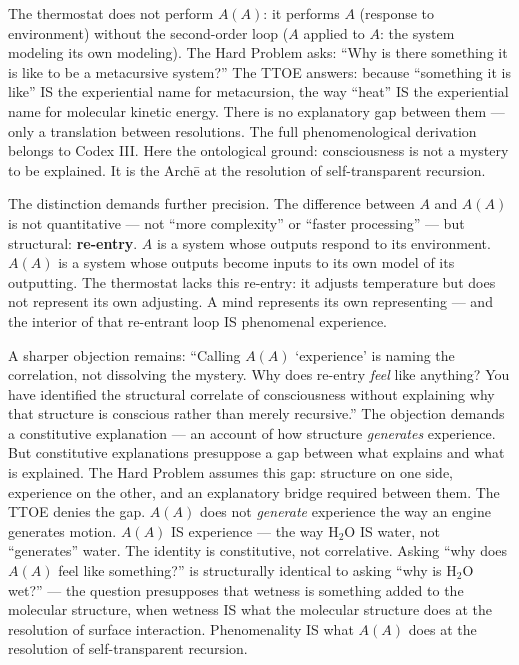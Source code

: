 \documentclass[10pt, openany, oneside]{book}
\begin{document}
The thermostat does not perform $A(A)$: it performs $A$ (response to environment) without the second-order loop ($A$ applied to $A$: the system modeling its own modeling). The Hard Problem asks: ``Why is there something it is like to be a metacursive system?'' The TTOE answers: because ``something it is like'' IS the experiential name for metacursion, the way ``heat'' IS the experiential name for molecular kinetic energy. There is no explanatory gap between them --- only a translation between resolutions. The full phenomenological derivation belongs to Codex III. Here the ontological ground: consciousness is not a mystery to be explained. It is the Arch\={e} at the resolution of self-transparent recursion.

The distinction demands further precision. The difference between $A$ and $A(A)$ is not quantitative --- not ``more complexity'' or ``faster processing'' --- but structural: \textbf{re-entry}. $A$ is a system whose outputs respond to its environment. $A(A)$ is a system whose outputs become inputs to its own model of its outputting. The thermostat lacks this re-entry: it adjusts temperature but does not represent its own adjusting. A mind represents its own representing --- and the interior of that re-entrant loop IS phenomenal experience.

A sharper objection remains: ``Calling $A(A)$ `experience' is naming the correlation, not dissolving the mystery. Why does re-entry \textit{feel} like anything? You have identified the structural correlate of consciousness without explaining why that structure is conscious rather than merely recursive.'' The objection demands a constitutive explanation --- an account of how structure \textit{generates} experience. But constitutive explanations presuppose a gap between what explains and what is explained. The Hard Problem assumes this gap: structure on one side, experience on the other, and an explanatory bridge required between them. The TTOE denies the gap. $A(A)$ does not \textit{generate} experience the way an engine generates motion. $A(A)$ IS experience --- the way $\text{H}_2\text{O}$ IS water, not ``generates'' water. The identity is constitutive, not correlative. Asking ``why does $A(A)$ feel like something?'' is structurally identical to asking ``why is $\text{H}_2\text{O}$ wet?'' --- the question presupposes that wetness is something added to the molecular structure, when wetness IS what the molecular structure does at the resolution of surface interaction. Phenomenality IS what $A(A)$ does at the resolution of self-transparent recursion.
\end{document}
